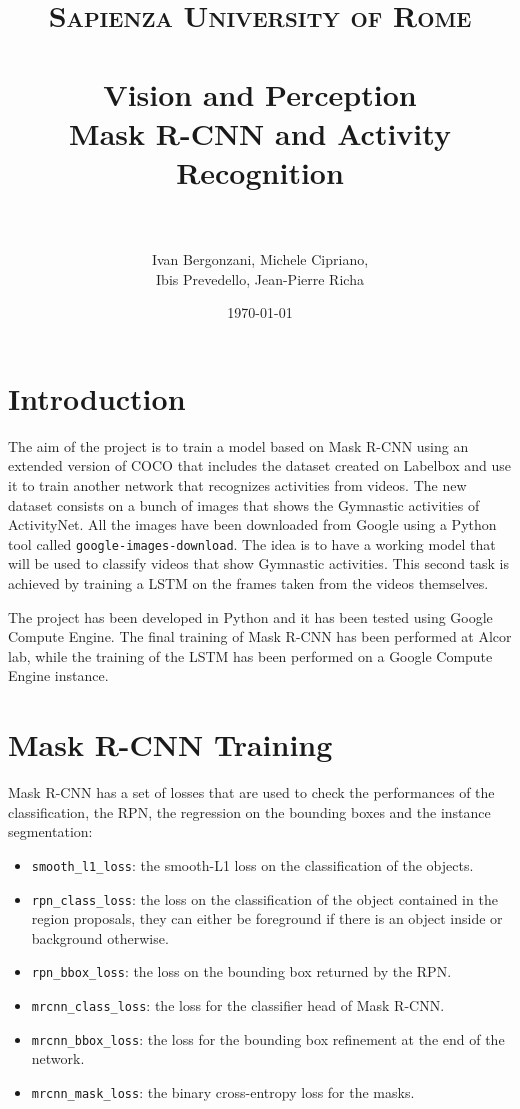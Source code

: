 \documentclass[12pt]{article}
\title{
\normalfont \normalsize
\textsc{Sapienza University of Rome} \\ [25pt] %
\horrule{0.5pt} \\[0.4cm] %
\LARGE Vision and Perception \\ %
\large Mask R-CNN and Activity Recognition \\
\horrule{2pt} \\[0.5cm] %
}
\author{Ivan Bergonzani, Michele Cipriano,\\Ibis Prevedello, Jean-Pierre Richa} %
\date{\normalsize\today} %
\numberwithin{equation}{section} %
\numberwithin{figure}{section} %
\numberwithin{table}{section} %
\theoremstyle{definition}
\begin{document}
\sloppy %

\maketitle %


\section{Introduction}

The aim of the project is to train a model based on Mask R-CNN\cite{he2017maskrcnn}
using an extended version of COCO that includes the dataset created on Labelbox and use it to train another network
that recognizes activities from videos.
The new dataset consists on a bunch of images that shows the Gymnastic activities
of ActivityNet. All the images have been downloaded from Google using a Python
tool called \texttt{google-images-download}. The idea is to have a working model that
will be used to classify videos that show Gymnastic activities.
This second task is achieved by training a LSTM on the 
frames taken from the videos themselves.

The project has been developed in Python and it has been tested using Google
Compute Engine. The final training of Mask R-CNN has been performed at Alcor lab, while the training of the LSTM
has been performed on a Google Compute Engine instance.


\section{Mask R-CNN Training}

Mask R-CNN has a set of losses that are used to check the performances of the
classification, the RPN, the regression on the bounding boxes and the instance
segmentation:
\begin{itemize}
    \item \texttt{smooth\_l1\_loss}: the smooth-L1 loss on the classification of the
        objects.
    \item \texttt{rpn\_class\_loss}: the loss on the classification of the
        object contained in the region proposals, they can either be foreground
        if there is an object inside or background otherwise.
    \item \texttt{rpn\_bbox\_loss}: the loss on the bounding box returned by the RPN.
    \item \texttt{mrcnn\_class\_loss}: the loss for the classifier head of Mask
        R-CNN.
    \item \texttt{mrcnn\_bbox\_loss}: the loss for the bounding box refinement
        at the end of the network.
    \item \texttt{mrcnn\_mask\_loss}: the binary cross-entropy loss for the masks.
\end{itemize}
\end{document}
